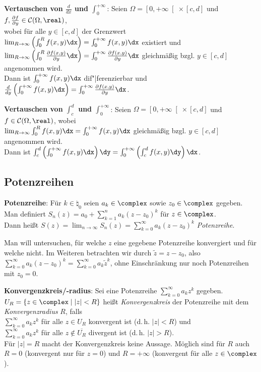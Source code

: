 \linie

\textbf{Vertauschen von $\frac{d}{dx}$ und $\int_0^{+\infty}$}:
Seien $\Omega = \left[0, +\infty\right[ \times [c,d]$ und
$f, \frac{\partial f}{\partial y} \in \C(\Omega, \real)$, \\
wobei für alle $y \in [c,d]$ der Grenzwert
$\lim_{R \to \infty} \left(\int_0^R f(x,y)\dx\right) =
\int_0^{+\infty} f(x,y)\dx$ existiert und \\
$\lim_{R \to \infty}
\left(\int_0^R \frac{\partial f(x, y)}{\partial y}\dx\right) =
\int_0^{+\infty} \frac{\partial f(x,y)}{\partial y}\dx$ gleichmäßig
bzgl. $y \in [c,d]$ angenommen wird. \\
Dann ist $\int_0^{+\infty} f(x,y)\dx$ dif"|ferenzierbar und
$\frac{d}{dy} \left(\int_0^{+\infty} f(x,y)\dx\right) =
\int_0^{+\infty} \frac{\partial f(x,y)}{\partial y}\dx$.

\textbf{Vertauschen von $\int_c^d$ und $\int_0^{+\infty}$}:
Seien $\Omega = \left[0, +\infty\right[ \times [c,d]$ und
$f \in \C(\Omega, \real)$, wobei \\
$\lim_{R \to \infty} \int_0^R f(x,y)\dx = \int_0^{+\infty} f(x,y)\dx$
gleichmäßig bzgl. $y \in [c,d]$ angenommen wird. \\
Dann ist $\int_c^d \left(\int_0^{+\infty} f(x,y)\dx\right)\dy =
\int_0^{+\infty} \left(\int_c^d f(x,y)\dy\right)\dx$.

\subsection{%
    Potenzreihen%
}

\textbf{Potenzreihe}:
Für $k \in \natural_0$ seien $a_k \in \complex$ sowie $z_0 \in \complex$
gegeben. \\
Man definiert $S_n(z) = a_0 + \sum_{k=1}^n a_k(z - z_0)^k$ für
$z \in \complex$. \\
Dann heißt $S(z) = \lim_{n \to \infty} S_n(z) =
\sum_{k=0}^\infty a_k(z - z_0)^k$ \emph{Potenzreihe}.

Man will untersuchen, für welche $z$ eine gegebene Potenzreihe konvergiert
und für welche nicht.
Im Weiteren betrachten wir durch $\widetilde{z} = z - z_0$, also
$\sum_{k=0}^\infty a_k (z - z_0)^k = \sum_{k=0}^\infty a_k \widetilde{z}^k$,
ohne Einschränkung nur noch Potenzreihen mit $z_0 = 0$.

\textbf{Konvergenzkreis/-radius}:
Sei eine Potenzreihe $\sum_{k=0}^\infty a_k z^k$ gegeben.
$U_R = \{z \in \complex \;|\; |z| < R\}$ heißt \emph{Konvergenzkreis}
der Potenzreihe mit dem \emph{Konvergenzradius} $R$, falls \\
$\sum_{k=0}^\infty a_k z^k$ für alle $z \in U_R$ konvergent ist
(d.\,h. $|z| < R$) und \\
$\sum_{k=0}^\infty a_k z^k$ für alle $z \notin \overline{U_R}$ divergent ist
(d.\,h. $|z| > R$). \\
Für $|z| = R$ macht der Konvergenzkreis keine Aussage.
Möglich sind für $R$ auch $R = 0$ (konvergent nur für $z = 0$)
und $R = +\infty$ (konvergent für alle $z \in \complex$).

